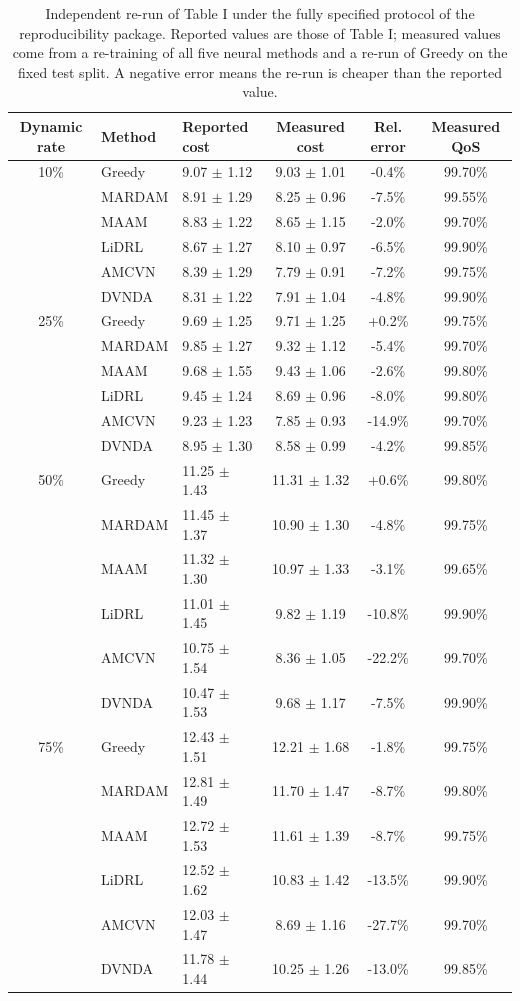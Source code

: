 \begin{table}[t]
\centering
\caption{Independent re-run of Table I under the fully specified protocol of the reproducibility package. Reported values are those of Table I; measured values come from a re-training of all five neural methods and a re-run of Greedy on the fixed test split. A negative error means the re-run is cheaper than the reported value.}
\label{tab:reproduction_n20}
\begin{tabular}{cllccc}
\toprule
Dynamic rate & Method & Reported cost & Measured cost & Rel. error & Measured QoS \\
\midrule
10\% & Greedy & 9.07 $\pm$ 1.12 & 9.03 $\pm$ 1.01 & -0.4\% & 99.70\% \\
 & MARDAM & 8.91 $\pm$ 1.29 & 8.25 $\pm$ 0.96 & -7.5\% & 99.55\% \\
 & MAAM & 8.83 $\pm$ 1.22 & 8.65 $\pm$ 1.15 & -2.0\% & 99.70\% \\
 & LiDRL & 8.67 $\pm$ 1.27 & 8.10 $\pm$ 0.97 & -6.5\% & 99.90\% \\
 & AMCVN & 8.39 $\pm$ 1.29 & 7.79 $\pm$ 0.91 & -7.2\% & 99.75\% \\
 & DVNDA & 8.31 $\pm$ 1.22 & 7.91 $\pm$ 1.04 & -4.8\% & 99.90\% \\
\midrule
25\% & Greedy & 9.69 $\pm$ 1.25 & 9.71 $\pm$ 1.25 & +0.2\% & 99.75\% \\
 & MARDAM & 9.85 $\pm$ 1.27 & 9.32 $\pm$ 1.12 & -5.4\% & 99.70\% \\
 & MAAM & 9.68 $\pm$ 1.55 & 9.43 $\pm$ 1.06 & -2.6\% & 99.80\% \\
 & LiDRL & 9.45 $\pm$ 1.24 & 8.69 $\pm$ 0.96 & -8.0\% & 99.80\% \\
 & AMCVN & 9.23 $\pm$ 1.23 & 7.85 $\pm$ 0.93 & -14.9\% & 99.70\% \\
 & DVNDA & 8.95 $\pm$ 1.30 & 8.58 $\pm$ 0.99 & -4.2\% & 99.85\% \\
\midrule
50\% & Greedy & 11.25 $\pm$ 1.43 & 11.31 $\pm$ 1.32 & +0.6\% & 99.80\% \\
 & MARDAM & 11.45 $\pm$ 1.37 & 10.90 $\pm$ 1.30 & -4.8\% & 99.75\% \\
 & MAAM & 11.32 $\pm$ 1.30 & 10.97 $\pm$ 1.33 & -3.1\% & 99.65\% \\
 & LiDRL & 11.01 $\pm$ 1.45 & 9.82 $\pm$ 1.19 & -10.8\% & 99.90\% \\
 & AMCVN & 10.75 $\pm$ 1.54 & 8.36 $\pm$ 1.05 & -22.2\% & 99.70\% \\
 & DVNDA & 10.47 $\pm$ 1.53 & 9.68 $\pm$ 1.17 & -7.5\% & 99.90\% \\
\midrule
75\% & Greedy & 12.43 $\pm$ 1.51 & 12.21 $\pm$ 1.68 & -1.8\% & 99.75\% \\
 & MARDAM & 12.81 $\pm$ 1.49 & 11.70 $\pm$ 1.47 & -8.7\% & 99.80\% \\
 & MAAM & 12.72 $\pm$ 1.53 & 11.61 $\pm$ 1.39 & -8.7\% & 99.75\% \\
 & LiDRL & 12.52 $\pm$ 1.62 & 10.83 $\pm$ 1.42 & -13.5\% & 99.90\% \\
 & AMCVN & 12.03 $\pm$ 1.47 & 8.69 $\pm$ 1.16 & -27.7\% & 99.70\% \\
 & DVNDA & 11.78 $\pm$ 1.44 & 10.25 $\pm$ 1.26 & -13.0\% & 99.85\% \\
\bottomrule
\end{tabular}
\end{table}
